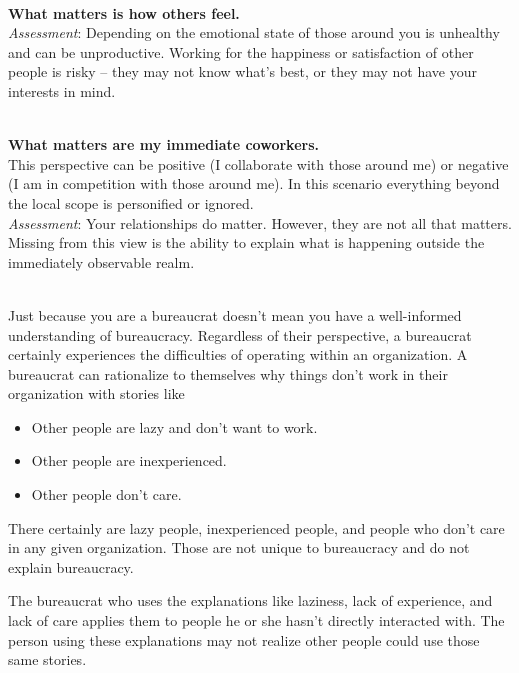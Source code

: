 \ \\ 
\textbf{What matters is how others feel.}\\
\textit{Assessment}: Depending on the emotional state of those around you is unhealthy and can be unproductive. Working for the happiness or satisfaction of other people is risky -- they may not know what's best, or they may not have your interests in mind.

\ \\
\textbf{What matters are my immediate coworkers.}\\
This perspective can be positive (I collaborate with those around me) or negative (I am in competition with those around me).
In this scenario everything beyond the local scope is personified or ignored.  \\
\textit{Assessment}: Your relationships do matter. However, they are not all that matters. Missing from this view is the ability to explain what is happening outside the immediately observable realm. 

\ \\

Just because you are a bureaucrat doesn't mean you have a well-informed understanding of bureaucracy. Regardless of their perspective, a bureaucrat certainly experiences the difficulties of operating within an organization. A bureaucrat can rationalize to themselves why things don't work in their organization with stories like
\begin{itemize}
\item Other people are lazy and don't want to work.
\item Other people are inexperienced.
\item Other people don't care.
\end{itemize}
There certainly are lazy people, inexperienced people, and people who don't care in any given organization. Those are not unique to bureaucracy and do not explain bureaucracy.

The bureaucrat who uses the explanations like laziness, lack of experience, and lack of care applies them to people he or she hasn't directly interacted with.  The person using these explanations may not realize other people could use those same stories. 